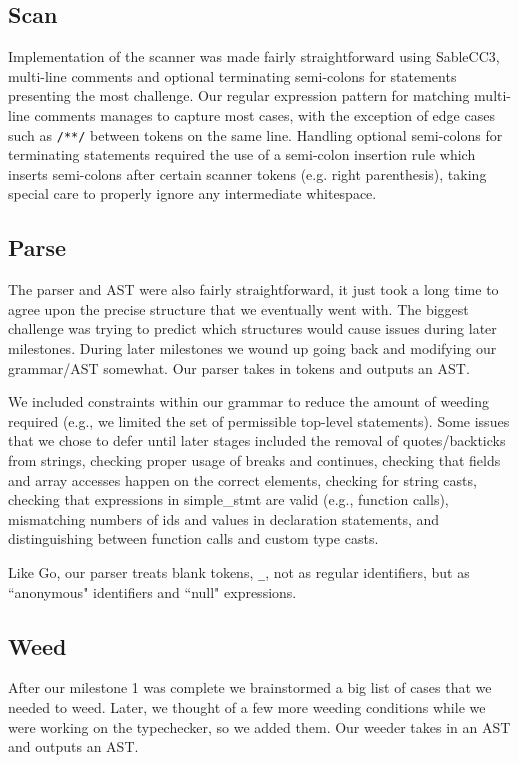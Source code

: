 \documentclass{article}
\begin{document}
\subsection{Scan}

Implementation of the scanner was made fairly straightforward using SableCC3, multi-line comments and optional terminating semi-colons for statements presenting the most challenge. Our regular expression pattern for matching multi-line comments manages to capture most cases, with the exception of edge cases such as \texttt{/**/} between tokens on the same line. Handling optional semi-colons for terminating statements required the use of a semi-colon insertion rule which inserts semi-colons after certain scanner tokens (e.g. right parenthesis), taking special care to properly ignore any intermediate whitespace.


\subsection{Parse}

The parser and AST were also fairly straightforward, it just took a long time to agree upon the precise structure that we eventually went with. The biggest challenge was trying to predict which structures would cause issues during later milestones. During later milestones we wound up going back and modifying our grammar/AST somewhat. Our parser takes in tokens and outputs an AST.

We included constraints within our grammar to reduce the amount of weeding required (e.g., we limited the set of permissible top-level statements). Some issues that we chose to defer until later stages included the removal of quotes/backticks from strings, checking proper usage of breaks and continues, checking that fields and array accesses happen on the correct elements, checking for string casts, checking that expressions in simple\_stmt are valid (e.g., function calls), mismatching numbers of ids and values in declaration statements, and distinguishing between function calls and custom type casts.

Like Go, our parser treats blank tokens, \texttt{\_}, not as regular identifiers, but as ``anonymous" identifiers and ``null" expressions.

\subsection{Weed}

After our milestone 1 was complete we brainstormed a big list of cases that we needed to weed. Later, we thought of a few more weeding conditions while we were working on the typechecker, so we added them. Our weeder takes in an AST and outputs an AST.
\end{document}
